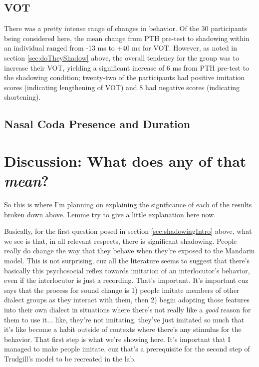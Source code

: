         \subsection{VOT}
        There was a pretty intense range of changes in behavior. Of the 30 participants being considered here, the mean change from PTH pre-test to shadowing within an individual ranged 
        from -13 ms %
        to +40 ms %
        for VOT. However, as noted in section \ref{sec:doTheyShadow} above, the overall tendency for the group was to increase their VOT, yielding a significant increase of 6 ms from PTH pre-test to the shadowing condition; twenty-two of the participants had positive imitation scores %
        (indicating lengthening of VOT) and 8 had negative scores (indicating shortening). 

        \subsection{Nasal Coda Presence and Duration}


    \section{Discussion: What does any of that \textit{mean}?}
    \label{sec:shadowingDiscussion}
    So this is where I'm planning on explaining the significance of each of the results broken down above. Lemme try to give a little explanation here now.

    Basically, for the first question posed in section \ref{sec:shadowingIntro} above, what we see is that, in all relevant respects, there is significant shadowing. People really do change the way that they behave when they're exposed to the Mandarin model. This is not surprising, cuz all the literature seems to suggest that there's basically this psychosocial reflex towards imitation of an interlocutor's behavior, even if the interlocutor is just a recording. That's important. It's important cuz \cite{trudgill1986dialects} says that the process for sound change is 1) people imitate members of other dialect groups as they interact with them, then 2) begin adopting those features into their own dialect in situations where there's not really like a \textit{good} reason for them to use it... like, they're not imitating, they've just imitated so much that it's like become a habit outside of contexts where there's any stimulus for the behavior. That first step is what we're showing here. It's important that I managed to make people imitate, cuz that's a prerequisite for the second step of Trudgill's model to be recreated in the lab.

